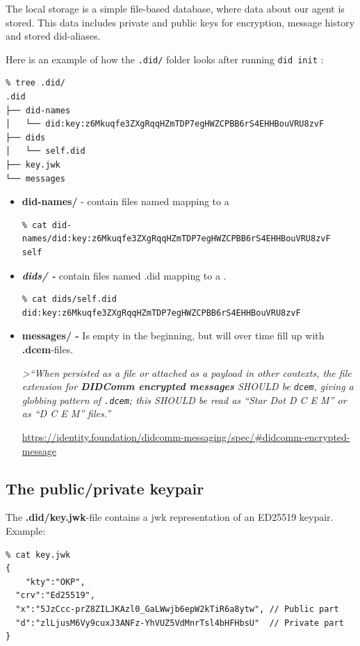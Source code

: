 The local storage is a simple file-based database, where data about our
agent is stored. This data includes private and public keys for
encryption, message history and stored did-aliases.

Here is an example of how the \lstinline!.did/! folder
looks after running \lstinline!did init! :

\begin{lstlisting}
% tree .did/
.did
├── did-names
│   └── did:key:z6Mkuqfe3ZXgRqqHZmTDP7egHWZCPBB6rS4EHHBouVRU8zvF
├── dids
│   └── self.did
├── key.jwk
└── messages
\end{lstlisting}

\begin{itemize}
\item
  \textbf{did-names/} - contain files named mapping to a

\begin{lstlisting}
% cat did-names/did:key:z6Mkuqfe3ZXgRqqHZmTDP7egHWZCPBB6rS4EHHBouVRU8zvF 
self
\end{lstlisting}
\item
  \textbf{\emph{dids/ -}} contain files named .did mapping to a .

\begin{lstlisting}
% cat dids/self.did  
did:key:z6Mkuqfe3ZXgRqqHZmTDP7egHWZCPBB6rS4EHHBouVRU8zvF
\end{lstlisting}
\item
  \textbf{messages/ -} Is empty in the beginning, but will over time
  fill up with \textbf{.dcem}-files.

  \emph{\textgreater{}``When persisted as a file or attached as a
  payload in other contexts, the file extension for \textbf{DIDComm
  encrypted messages} SHOULD be \lstinline!dcem!, giving a
  globbing pattern of \lstinline!.dcem!; this SHOULD be
  read as ``Star Dot D C E M'' or as ``D C E M'' files.''}

  \url{https://identity.foundation/didcomm-messaging/spec/\#didcomm-encrypted-message}
\end{itemize}

\hypertarget{the-publicprivate-keypair}{%
\subsection{The public/private
keypair}\label{the-publicprivate-keypair}}

The \textbf{.did/key.jwk}-file contains a jwk representation of an
ED25519 keypair. Example:

\begin{lstlisting}
% cat key.jwk 
{
    "kty":"OKP",
  "crv":"Ed25519",
  "x":"5JzCcc-prZ8ZILJKAzl0_GaLWwjb6epW2kTiR6a8ytw", // Public part
  "d":"zlLjusM6Vy9cuxJ3ANFz-YhVUZ5VdMnrTsl4bHFHbsU"  // Private part
}
\end{lstlisting}

